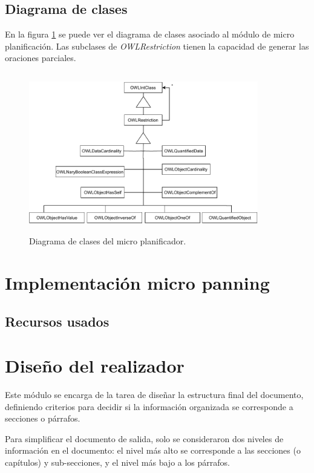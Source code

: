 \subsection{Diagrama de clases}
En la figura \ref{fig:diagrama_clases_microplanificador} se puede ver el diagrama de clases asociado al módulo de micro planificación. Las subclases de \emph{OWLRestriction} tienen la capacidad de generar las oraciones parciales.

\begin{figure}[H]
    \centering
    \includegraphics[width=10cm, height=7cm]{img/generacion_documento/diagrama_clases_microplanificador.pdf}
    \caption{Diagrama de clases del micro planificador.}
    \label{fig:diagrama_clases_microplanificador}
\end{figure}


\section{Implementación micro panning}

\subsection{Recursos usados}

\section{Diseño del realizador}
Este módulo se encarga de la tarea de diseñar la estructura final del documento, definiendo criterios para decidir si la información organizada se corresponde a secciones o párrafos.

Para simplificar el documento de salida, solo se consideraron dos niveles de información en el documento: el nivel más alto se corresponde a las secciones (o capítulos) y sub-secciones, y el nivel más bajo a los párrafos. 

